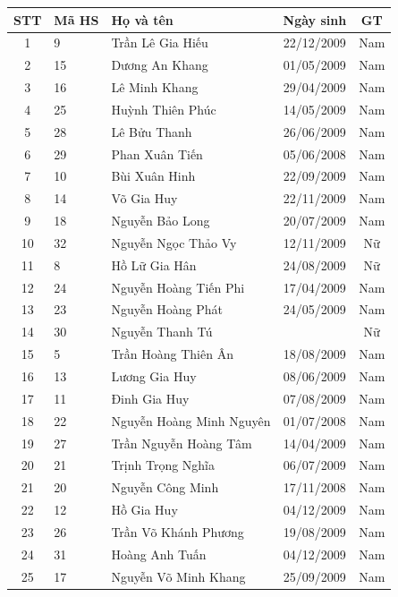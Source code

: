 \begin{longtable}{|c|l|p{6cm}|c|c|}
\hline
STT & Mã HS & Họ và tên & Ngày sinh & GT \\
\hline
1 & 9 & Trần Lê Gia Hiếu & 22/12/2009 & Nam \\
\hline
2 & 15 & Dương An Khang & 01/05/2009 & Nam \\
\hline
3 & 16 & Lê Minh Khang & 29/04/2009 & Nam \\
\hline
4 & 25 & Huỳnh Thiên Phúc & 14/05/2009 & Nam \\
\hline
5 & 28 & Lê Bửu Thanh & 26/06/2009 & Nam \\
\hline
6 & 29 & Phan Xuân Tiến & 05/06/2008 & Nam \\
\hline
7 & 10 & Bùi Xuân Hinh & 22/09/2009 & Nam \\
\hline
8 & 14 & Võ Gia Huy & 22/11/2009 & Nam \\
\hline
9 & 18 & Nguyễn Bảo Long & 20/07/2009 & Nam \\
\hline
10 & 32 & Nguyễn Ngọc Thảo Vy & 12/11/2009 & Nữ \\
\hline
11 & 8 & Hồ Lữ Gia Hân & 24/08/2009 & Nữ \\
\hline
12 & 24 & Nguyễn Hoàng Tiến Phi & 17/04/2009 & Nam \\
\hline
13 & 23 & Nguyễn Hoàng Phát & 24/05/2009 & Nam \\
\hline
14 & 30 & Nguyễn Thanh Tú &  & Nữ \\
\hline
15 & 5 & Trần Hoàng Thiên Ân & 18/08/2009 & Nam \\
\hline
16 & 13 & Lương Gia Huy & 08/06/2009 & Nam \\
\hline
17 & 11 & Đinh Gia Huy & 07/08/2009 & Nam \\
\hline
18 & 22 & Nguyễn Hoàng Minh Nguyên & 01/07/2008 & Nam \\
\hline
19 & 27 & Trần Nguyễn Hoàng Tâm & 14/04/2009 & Nam \\
\hline
20 & 21 & Trịnh Trọng Nghĩa & 06/07/2009 & Nam \\
\hline
21 & 20 & Nguyễn Công Minh & 17/11/2008 & Nam \\
\hline
22 & 12 & Hồ Gia Huy & 04/12/2009 & Nam \\
\hline
23 & 26 & Trần Võ Khánh Phương & 19/08/2009 & Nam \\
\hline
24 & 31 & Hoàng Anh Tuấn & 04/12/2009 & Nam \\
\hline
25 & 17 & Nguyễn Võ Minh Khang & 25/09/2009 & Nam \\

\end{longtable}
